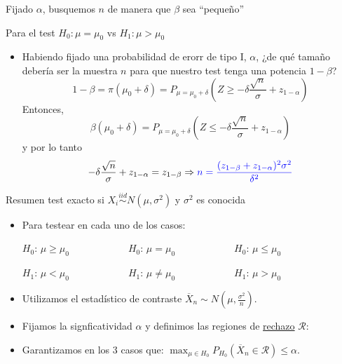 \documentclass{beamer}
\theoremstyle{definition}
\begin{document}
\begin{frame}{\color{rosee}Fijado $\alpha$, busquemos $n$ de manera que $\beta$ sea ``pequeño''}\small

Para el test $H_0:\mu=\mu_0$ vs $H_1:\mu>\mu_0$
  \begin{itemize}
  \item Habiendo fijado una probabilidad de erorr de tipo I, $\alpha$, ¿de qu\'e tama\~no deber\'ia ser la muestra $n$ para que nuestro
    test tenga una potencia $1-\beta$?
    \[ 1-\beta  = \pi(\mu_{0}+\delta) = P_{\mu = \mu_0 + \delta}\left(Z \geq - \delta \frac{\sqrt{n}}{\sigma} +
      z_{1-\alpha}\right)\] Entonces,
      $$
      \beta(\mu_0 + \delta) = P_{\mu = \mu_0 + \delta}\left(Z \leq - \delta \frac{\sqrt{n}}{\sigma} +
      z_{1-\alpha}\right)
      $$
      y por lo tanto
    \[-\delta \frac{\sqrt{n}}{\sigma} + z_ {1-\alpha} = z_{1-\beta} \Rightarrow
      \textcolor{blue}{n = \frac{(z_{1-\beta}+z_ {1-\alpha})^2
          \sigma^2}{\delta^2}}\]

  \end{itemize}
 \end{frame}


\begin{frame}{\color{rosee}Resumen test exacto si $X_i\stackrel{iid}{\sim} N(\mu,\sigma^2)$ y $\sigma^2$ es conocida}
\begin{itemize}
\item Para testear en cada uno de los casos: \medskip
	\begin{center}
		$H_{0}$: $\mu \geq \mu _{0} \qquad \qquad \qquad H_{0}$: $\mu =\mu _{0}\qquad \qquad \qquad
		H_{0}$: $\mu \leq \mu _{0}$
		
		$H_{1}$: $\mu <\mu _{0} \qquad \qquad \qquad H_{1}$: $\mu \neq \mu _{0}\qquad \qquad \qquad
		H_{1}$: $\mu >\mu_{0}$
	\end{center}
	\medskip
\item Utilizamos el estadístico de contraste	$\overline{X}_n\sim N\left(\mu,\frac{\sigma^2}{n}\right)$.  \medskip
\item Fijamos la signficatividad $\alpha$ y definimos las regiones de \underline{rechazo} $\mathcal{R}$:\medskip
\end{itemize}




\begin{itemize}
\item Garantizamos en los 3 casos que: $ \displaystyle\max_{\mu \in H_0}P_{H_0}\left(\overline{X}_n\in \mathcal{R}\right) \leq \alpha.$\medskip
\end{itemize}
\end{frame}
\end{document}
